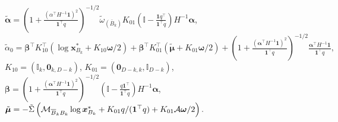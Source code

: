\documentclass[12pt]{article}
\begin{document}
\begin{lemma}
$\tilde{\bm\alpha}=\left(1 + \frac{\left(\alpha^\top H^{-1}\bm 1\right)^2}{\bm 1^\top q}\right)^{-1/2}\tilde\omega_{(\bar B_k)} K_{01}\left(\mathbb{I} - \frac{\bm 1 q^\top}{\bm 1^\top q}\right) H^{-1}\bm\alpha$,\\
$\tilde\alpha_0 = \bm\beta^\top K_{10}^\top(\log \bm x_{B_k}^{*}+K_{10}\bm\omega/2) + \bm\beta^\top K_{01}^\top(\tilde{\bm\mu} + K_{01}\bm\omega/2) +  \left(1 + \frac{(\bm\alpha^\top H^{-1}\bm 1)^2}{\bm 1^\top q}\right)^{-1/2}\frac{\bm\alpha^\top H^{-1}\bm 1}{\bm 1^\top q},$ \\
$K_{10} = (\mathbb I_{k},\bm 0_{k,D-k})$, 
$K_{01} = (\bm 0_{D-k,k},\mathbb I_{D-k})$, 
$\bm\beta = \left(1 + \frac{(\bm\alpha^\top H^{-1}\bm 1)^2}{\bm 1^\top q}\right)^{-1/2}\left(\mathbb I - \frac{q\bm 1^\top}{\bm 1^\top q}\right) H^{-1}\bm\alpha$, \\
$\tilde{\bm\mu} = -\tilde\Sigma\left({\mathcal M}_{{\overline{B}}_kB_k}\log \bm x_{B_k}^{*} + K_{01}q/(\bm 1^\top q)+K_{01}{\mathcal A}\bm\omega/2\right).$
\end{lemma}
\end{document}

